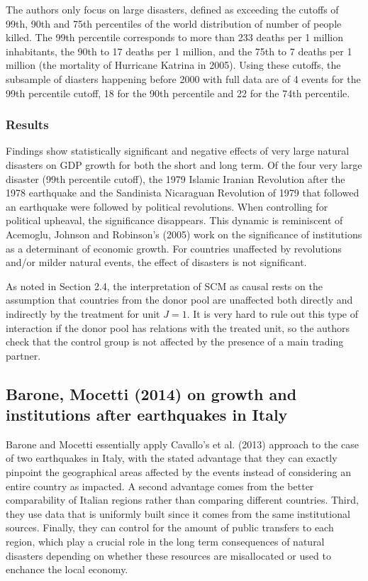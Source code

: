 \documentclass[12pt,a4paper,draft]{article}
\begin{document}
The authors only focus on large disasters, defined as exceeding the cutoffs of 99th, 90th 
and 75th percentiles of the world distribution of number of people killed. The 99th percentile 
corresponds to more than 233 deaths per 1 million inhabitants, the 90th to 17 deaths per 1 
million, and the 75th to 7 deaths per 1 million (the mortality of Hurricane Katrina in 2005).
Using these cutoffs, the subsample of diasters happening before 2000 with full data are of 4 
events for the 99th percentile cutoff, 18 for the 90th percentile and 22 for the 74th percentile.


\subsubsection*{Results}
Findings show statistically significant and negative effects of very large natural disasters 
on GDP growth for both the short and long term. 
Of the four very large disaster (99th percentile cutoff), the 1979 Islamic Iranian Revolution 
after the 1978 earthquake and the Sandinista Nicaraguan Revolution of 1979 that followed an 
earthquake were followed by political revolutions.
When controlling for political upheaval, the significance disappears. This dynamic is reminiscent 
of Acemoglu, Johnson and Robinson's (2005) work on the significance of institutions as a 
determinant of economic growth.
For countries unaffected by revolutions and/or milder natural events, the effect of disasters 
is not significant. 

As noted in Section 2.4, the interpretation of SCM as causal rests on the assumption that 
countries from the donor pool are unaffected both directly and indirectly by the treatment for 
unit $J=1$. It is very hard to rule out this type of interaction if the donor pool has relations 
with the treated unit, so the authors check that the control group is not affected by the 
presence of a main trading partner.



\subsection{Barone, Mocetti (2014) on growth and institutions after earthquakes in Italy}
Barone and Mocetti essentially apply Cavallo's et al. (2013) approach to the case of two 
earthquakes in Italy, with the stated advantage that they can exactly pinpoint the geographical 
areas affected by the events instead of considering an entire country as impacted. 
A second advantage comes from the better comparability of Italian 
regions rather than comparing different countries. Third, they use data that is uniformly built 
since it comes from the same institutional sources. Finally, they can control for the amount of 
public transfers to each region, which play a crucial role in the long term consequences of 
natural disasters depending on whether these resources are misallocated or used to enchance the 
local economy.
\end{document}
